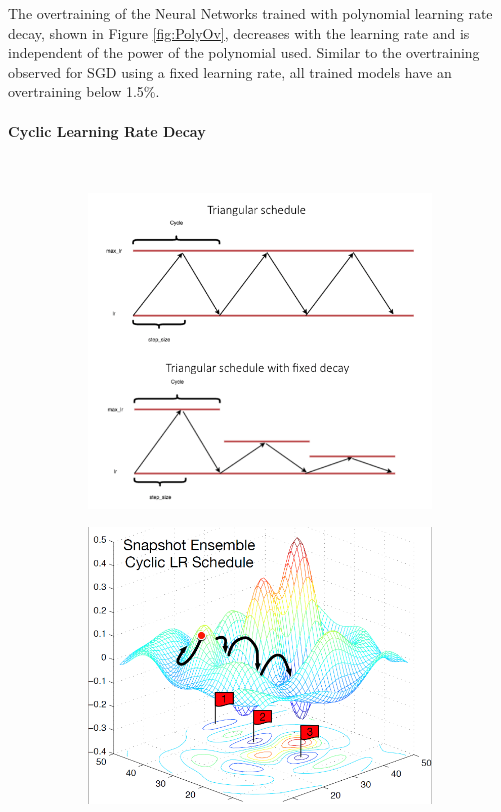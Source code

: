 The overtraining of the Neural Networks trained with polynomial learning rate decay, shown in Figure \ref{fig:PolyOv}, decreases with the learning rate and is independent of the power of the polynomial used. Similar to the overtraining observed for SGD using a fixed learning rate, all trained models have an overtraining below 1.5\%.




\paragraph{Cyclic Learning Rate Decay} \mbox{} \\

\begin{figure}[H]
\begin{subfigure}{.5\textwidth}
  \centering
  \includegraphics[width=.95\linewidth]{figs/Cycle}
  \caption{}
\end{subfigure}%
\begin{subfigure}{.5\textwidth}
  \centering
  \includegraphics[width=.97\linewidth]{figs/topolgy}

\end{subfigure}
\end{figure}
